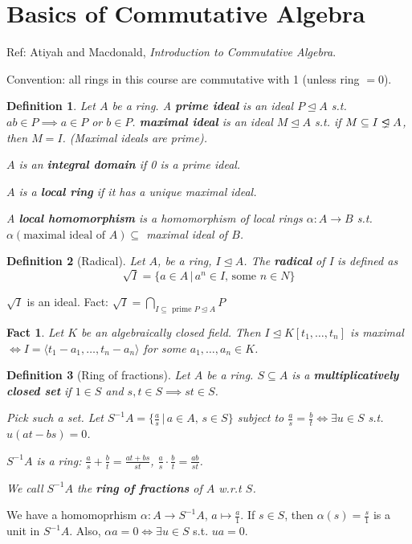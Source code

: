 \documentclass[a4paper]{article}
\newtheorem*{definition}{Definition}
\newtheorem*{fact}{Fact}
\newcommand{\properideal}{%
	\mathrel{\ooalign{$\lneq$\cr\raise.22ex\hbox{$\lhd$}\cr}}}
\begin{document}
\section{Basics of Commutative Algebra}
Ref: Atiyah and Macdonald, \textit{Introduction to Commutative Algebra}.

Convention: all rings in this course are commutative with 1 (unless ring $=0$).

\begin{definition}
	Let $A$ be a ring. A \textbf{prime ideal} is an ideal $P \trianglelefteq A$ s.t. $ab \in P \implies a \in P$ or $b \in P$. \textbf{maximal ideal} is an ideal $M \trianglelefteq A$ s.t. if $M \subseteq I \properideal A$, then $M=I$. (Maximal ideals are prime).
	
	$A$ is an \textbf{integral domain} if 0 is a prime ideal.
	
	$A$ is a \textbf{local ring} if it has a unique maximal ideal.
	
	A \textbf{local homomorphism} is a homomorphism of local rings $\alpha: A \to B$ s.t. $\alpha(\text{maximal ideal of } A) \subseteq$ maximal ideal of $B$.
\end{definition}

\begin{definition}[Radical]
	Let $A$, be a ring, $I \trianglelefteq A$. The \textbf{radical} of I is defined as $$\sqrt{I} = \{a\in A \,|\, a^n \in I\text{, some } n \in N\}$$
\end{definition}
\noindent$\sqrt{I}$ is an ideal. Fact: $\sqrt{I} = \bigcap_{I \subseteq \text{ prime } P \trianglelefteq A} P$

\begin{fact}
	Let $K$ be an algebraically closed field. Then $I \trianglelefteq K[t_1,\dots,t_n]$ is maximal $\iff I = \langle t_1-a_1,\dots,t_n-a_n\rangle$ for some $a_1,\dots,a_n \in K$.
\end{fact}

\begin{definition}[Ring of fractions]
	Let $A$ be a ring. $S \subseteq A$ is a \textbf{multiplicatively closed set} if $1 \in S$ and $s,t \in S \implies st \in S$.
	
	Pick such a set. Let $S^{-1}A = \{\frac{a}{s} \,|\, a \in A,\, s \in S\}$ subject to $\frac{a}{s} = \frac{b}{t} \iff \exists u \in S$ s.t. $u(at-bs)=0$.
	
	$S^{-1}A$ is a ring: $\frac{a}{s}+\frac{b}{t} = \frac{at+bs}{st}$, $\frac{a}{s}\cdot\frac{b}{t}=\frac{ab}{st}$.
	
	We call $S^{-1}A$ the \textbf{ring of fractions} of $A$ w.r.t $S$.
\end{definition}
We have a homomoprhism $\alpha:A \to S^{-1}A$, $a \mapsto \frac{a}{1}$. If $s \in S$, then $\alpha(s) = \frac{s}{1}$ is a unit in $S^{-1}A$. Also, $\alpha{a}=0 \iff \exists u \in S$ s.t. $ua=0$.
\end{document}
